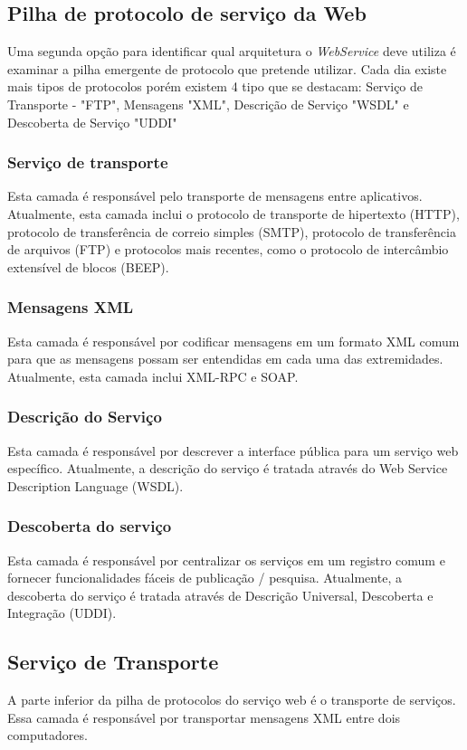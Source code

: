 \documentclass[12pt]{article}
\begin{document}
\subsection{Pilha de protocolo de serviço da Web}
Uma segunda opção para identificar qual arquitetura o  \textit{WebService} deve utiliza é examinar a pilha emergente de protocolo que pretende utilizar. Cada dia existe mais tipos de protocolos porém existem 4 tipo que se destacam: Serviço de Transporte - "FTP", Mensagens "XML", Descrição de Serviço "WSDL"  e Descoberta de Serviço "UDDI" 

\subsubsection {Serviço de transporte}
Esta camada é responsável pelo transporte de mensagens entre aplicativos. Atualmente, esta camada inclui o protocolo de transporte de hipertexto (HTTP), protocolo de transferência de correio simples (SMTP), protocolo de transferência de arquivos (FTP) e protocolos mais recentes, como o protocolo de intercâmbio extensível de blocos (BEEP).

\subsubsection {Mensagens XML}
Esta camada é responsável por codificar mensagens em um formato XML comum para que as mensagens possam ser entendidas em cada uma das extremidades. Atualmente, esta camada inclui XML-RPC e SOAP.

\subsubsection {Descrição do Serviço}
Esta camada é responsável por descrever a interface pública para um serviço web específico. Atualmente, a descrição do serviço é tratada através do Web Service Description Language (WSDL).

\subsubsection {Descoberta do serviço}
Esta camada é responsável por centralizar os serviços em um registro comum e fornecer funcionalidades fáceis de publicação / pesquisa. Atualmente, a descoberta do serviço é tratada através de Descrição Universal, Descoberta e Integração (UDDI).

\subsection {Serviço de Transporte}
A parte inferior da pilha de protocolos do serviço web é o transporte de serviços. Essa camada é responsável por transportar mensagens XML entre dois computadores.
\end{document}

